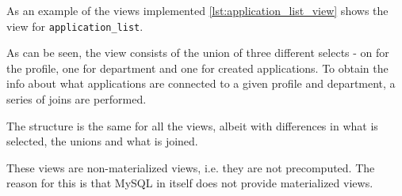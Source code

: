 As an example of the views implemented \autoref{lst:application_list_view} shows the view for \lstinline|application_list|.



As can be seen, the view consists of the union of three different selects - on for the profile, one for department and one for created applications. To obtain the info about what applications are connected to a given profile and department, a series of joins are performed.

The structure is the same for all the views, albeit with differences in what is selected, the unions and what is joined.

These views are non-materialized views, i.e. they are not precomputed. The reason for this is that MySQL in itself does not provide materialized views. \cite{fromdual}